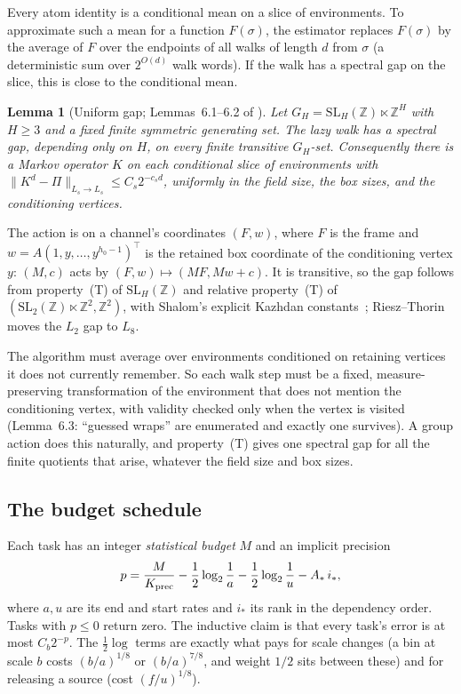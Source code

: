 \documentclass[11pt]{article}
\newtheorem{lemma}[theorem]{Lemma}
\theoremstyle{definition}
\theoremstyle{remark}
\begin{document}
Every atom identity is a conditional mean on a slice of environments. To
approximate such a mean for a function $F(\sigma)$, the estimator replaces
$F(\sigma)$ by the average of $F$ over the endpoints of all walks of length $d$ from
$\sigma$ (a deterministic sum over $2^{O(d)}$ walk words). If the walk has a
spectral gap on the slice, this is close to the conditional mean.

\begin{lemma}[Uniform gap; Lemmas~6.1--6.2 of \cite{OpenAI-BPL}]
Let $G_H=\mathrm{SL}_H(\mathbb Z)\ltimes\mathbb Z^H$ with $H\ge3$ and a fixed
finite symmetric generating set. The lazy walk has a spectral gap, depending only
on $H$, on every finite transitive $G_H$-set. Consequently there is a Markov
operator $K$ on each conditional slice of environments with
$\|K^d-\Pi\|_{L_s\to L_s}\le C_s2^{-c_sd}$, uniformly in the field size, the box
sizes, and the conditioning vertices.
\end{lemma}

The action is on a channel's coordinates $(F,w)$, where $F$ is the frame and
$w=A(1,y,\dots,y^{h_0-1})^\top$ is the retained box coordinate of the conditioning
vertex $y$: $(M,c)$ acts by $(F,w)\mapsto(MF,Mw+c)$. It is transitive, so the gap
follows from property~(T) of $\mathrm{SL}_H(\mathbb Z)$ and relative property~(T) of
$(\mathrm{SL}_2(\mathbb Z)\ltimes\mathbb Z^2,\mathbb Z^2)$, with Shalom's explicit
Kazhdan constants~\cite{Shalom}; Riesz--Thorin moves the $L_2$ gap to $L_8$.

\begin{idea}
The algorithm must average over environments conditioned on retaining vertices
it does not currently remember. So each walk step must be a fixed,
measure-preserving transformation of the environment that does not mention the
conditioning vertex, with validity checked only when the vertex is visited
(Lemma~6.3: ``guessed wraps'' are enumerated and exactly one survives). A group
action does this naturally, and property~(T) gives one spectral gap for all the
finite quotients that arise, whatever the field size and box sizes.
\end{idea}

\subsection{The budget schedule}\label{sec:budget}

Each task has an integer \emph{statistical budget} $M$ and an implicit precision
\[
p=\frac{M}{K_{\rm prec}}-\frac12\log_2\frac1a-\frac12\log_2\frac1u-A_*\,i_*,
\]
where $a,u$ are its end and start rates and $i_*$ its rank in the dependency
order. Tasks with $p\le0$ return zero. The inductive claim is that every task's
error is at most $C_b2^{-p}$. The $\frac12\log$ terms are exactly what pays for
scale changes (a bin at scale $b$ costs $(b/a)^{1/8}$ or $(b/a)^{7/8}$, and weight
$1/2$ sits between these) and for releasing a source (cost $(f/u)^{1/8}$).
\end{document}
